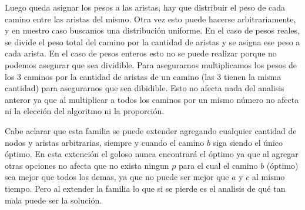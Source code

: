 Luego queda asignar los pesos a las aristas, hay que distribuir el peso de cada camino entre las aristas del mismo. Otra vez esto puede hacerse arbitrariamente, y en nuestro caso buscamos una distribución uniforme.
En el caso de pesos reales, se divide el peso total del camino por la cantidad de aristas y se asigna ese peso a cada arista.
En el caso de pesos enteros esto no se puede realizar porque no podemos asegurar que sea dividible. Para asegurarnos multiplicamos los pesos de los 3 caminos por la cantidad de aristas de un camino (las 3 tienen la misma cantidad) para asegurarnos que sea dibidible. Esto no afecta nada del analisis anteror ya que al multiplicar a todos los caminos por un mismo número no afecta ni la elección del algoritmo ni la proporción.

Cabe aclarar que esta familia se puede extender agregando cualquier cantidad de nodos y aristas arbitrarias, siempre y cuando el camino $b$ siga siendo el único óptimo. En esta extención el goloso nunca encontrará el óptimo ya que al agregar otras opciones no afecta que no exista ningun $p$ para el cual el camino $b$ (óptimo) sea mejor que todos los demas, ya que no puede ser mejor que $a$ y $c$ al mismo tiempo. Pero al extender la familia lo que si se pierde es el analisis de	qué tan mala puede ser la solución.  